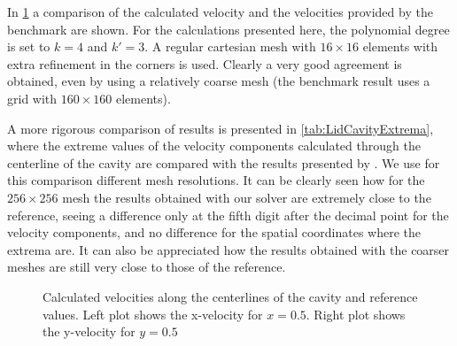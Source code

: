 In \cref{fig:LidVelocities} a comparison of the calculated velocity and the velocities provided by the benchmark are shown. For the calculations presented here, the polynomial degree is set to $k = 4$ and $k' = 3$. A regular cartesian mesh with $16\times16$ elements with extra refinement in the corners is used. Clearly a very good agreement is obtained, even by using a relatively coarse mesh (the benchmark result uses a grid with $160\times160$ elements). 

A more rigorous comparison of results is presented in \cref{tab:LidCavityExtrema}, where the extreme values of the velocity components calculated through the centerline of the cavity are compared with the results presented by \cite{botellaBenchmarkSpectralResults1998}. We use for this comparison different mesh resolutions. It can be clearly seen how for the $256\times 256$ mesh the results obtained with our solver are extremely close to the reference, seeing a difference only at the fifth digit after the decimal point for the velocity components, and no difference for the spatial coordinates where the extrema are. It can also be appreciated how the results obtained with the coarser meshes are still very close to those of the reference. 

\newpage
	\begin{figure}[tb]
		\caption{Calculated velocities along the centerlines of the cavity and reference values. Left plot shows the x-velocity for $x = 0.5$. Right plot shows the y-velocity for $y = 0.5$  }
		\label{fig:LidVelocities}
	\end{figure}

